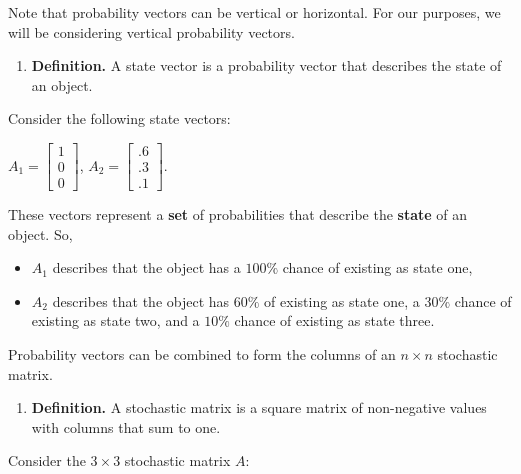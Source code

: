 \documentclass{article}
\begin{document}
\setlength{\parskip}{15pt}

\noindent Note that probability vectors can be vertical or horizontal. For our purposes, we will be considering vertical probability vectors.

\setlength{\parskip}{10pt}

\begin{enumerate}[label=]
    \item \textbf{Definition.} A state vector is a probability vector that describes the state of an object.
\end{enumerate}

\setlength{\parskip}{10pt}

\noindent Consider the following state vectors:

\begin{center}
    $A_1=\begin{bmatrix} 1\\0\\0\end{bmatrix}$, $A_2=\begin{bmatrix}.6\\.3\\.1\end{bmatrix}$.
\end{center}

\noindent These vectors represent a \textbf{set} of probabilities that describe the \textbf{state} of an object. So, 
\begin{itemize}
    \setlength\itemsep{-1em}
    \item $A_1$ describes that the object has a $100\%$ chance of existing as state one,
    \item $A_2$ describes that the object has $60\%$ of existing as state one, a $30\%$ chance of existing as state two, and a $10\%$ chance of existing as state three.
\end{itemize}
    
\noindent Probability vectors can be combined to form the columns of an $n \times n$ stochastic matrix.

\setlength{\parskip}{15pt}

\begin{enumerate}[label=]
    \item \textbf{Definition.} A stochastic matrix is a square matrix of non-negative values with columns that sum to one.
\end{enumerate}

\setlength{\parskip}{10pt}

\noindent Consider the $3 \times 3$ stochastic matrix $A$:
\end{document}
